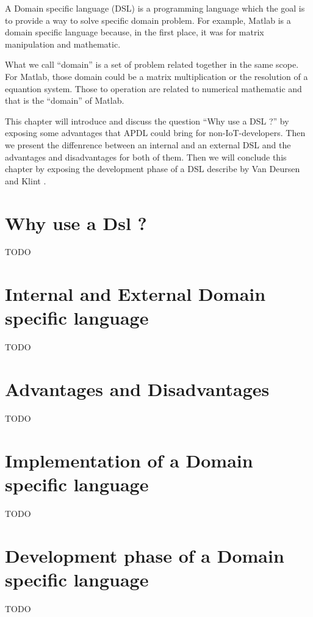 \label{cha:a-dsl}

A Domain specific language (DSL) is a programming language which the goal is
to provide a way to solve specific domain problem. For example, Matlab is a
domain specific language because, in the first place, it was for matrix
manipulation and mathematic.

What we call ``domain'' is a set of problem related together in the same scope.
For Matlab, those domain could be a matrix multiplication or the resolution of a
equantion system. Those to operation are related to numerical mathematic and
that is the ``domain'' of Matlab.

This chapter will introduce and discuss the question ``Why use a DSL ?'' by
exposing some advantages that \gls{APDL} could bring for non-IoT-developers.
Then we present the diffenrence between an internal and an external DSL and the
advantages and disadvantages for both of them. Then we will conclude this
chapter by exposing the development phase of a DSL describe by Van Deursen and
Klint \cite{little_languages_little_maintenance}.

\section{Why use a Dsl ?}
\label{sec:why-use-dsl}

TODO

\section{Internal and External Domain specific language}
\label{sec:internal_and_external_dsl}

TODO

\section{Advantages and Disadvantages}
\label{sec:dsl-advantages-disadvantages}

TODO

\section{Implementation of a Domain specific language}
\label{sec:implementation_of_a_dsl}

TODO

\section{Development phase of a Domain specific language}

TODO

